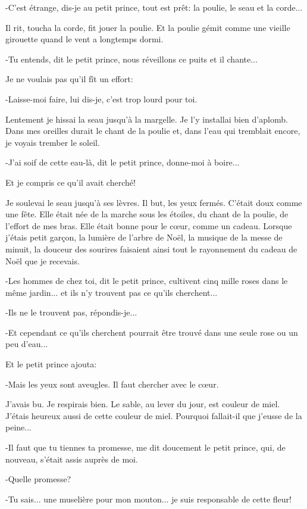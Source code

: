 \documentclass{report}
\begin{document}
\begin{paracol}{2}
-C'est étrange, dis-je au petit prince, tout est prêt: la poulie, le seau et la corde...

Il rit, toucha la corde, fit jouer la poulie. Et la poulie gémit comme une vieille girouette quand le vent a longtemps dormi.

-Tu entends, dit le petit prince, nous réveillons ce puits et il chante...

Je ne voulais pas qu'il fît un effort:

-Laisse-moi faire, lui dis-je, c'est trop lourd pour toi.

Lentement je hissai la seau jusqu'à la margelle. Je l'y installai bien d'aplomb. Dans mes oreilles durait le chant de la poulie et, dans l'eau qui tremblait encore, je voyais trember le soleil.

-J'ai soif de cette eau-là, dit le petit prince, donne-moi à boire...

Et je compris ce qu'il avait cherché!

Je soulevai le seau jusqu'à ses lèvres. Il but, les yeux fermés. C'était doux comme une fête. Elle était née de la marche sous les étoiles, du chant de la poulie, de l'effort de mes bras. Elle était bonne pour le cœur, comme un cadeau. Lorsque j'étais petit garçon, la lumière de l'arbre de Noël, la musique de la messe de minuit, la douceur des sourires faisaient ainsi tout le rayonnement du cadeau de Noël que je recevais.

-Les hommes de chez toi, dit le petit prince, cultivent cinq mille roses dans le même jardin... et ils n'y trouvent pas ce qu'ils cherchent...

-Ils ne le trouvent pas, répondis-je...

-Et cependant ce qu'ils cherchent pourrait être trouvé dans une seule rose ou un peu d'eau...

Et le petit prince ajouta:

-Mais les yeux sont aveugles. Il faut chercher avec le cœur.

J'avais bu. Je respirais bien. Le sable, au lever du jour, est couleur de miel. J'étais heureux aussi de cette couleur de miel. Pourquoi fallait-il que j'eusse de la peine...

-Il faut que tu tiennes ta promesse, me dit doucement le petit prince, qui, de nouveau, s'était assis auprès de moi.

-Quelle promesse?

-Tu sais... une muselière pour mon mouton... je suis responsable de cette fleur!


\end{paracol}
\end{document}
